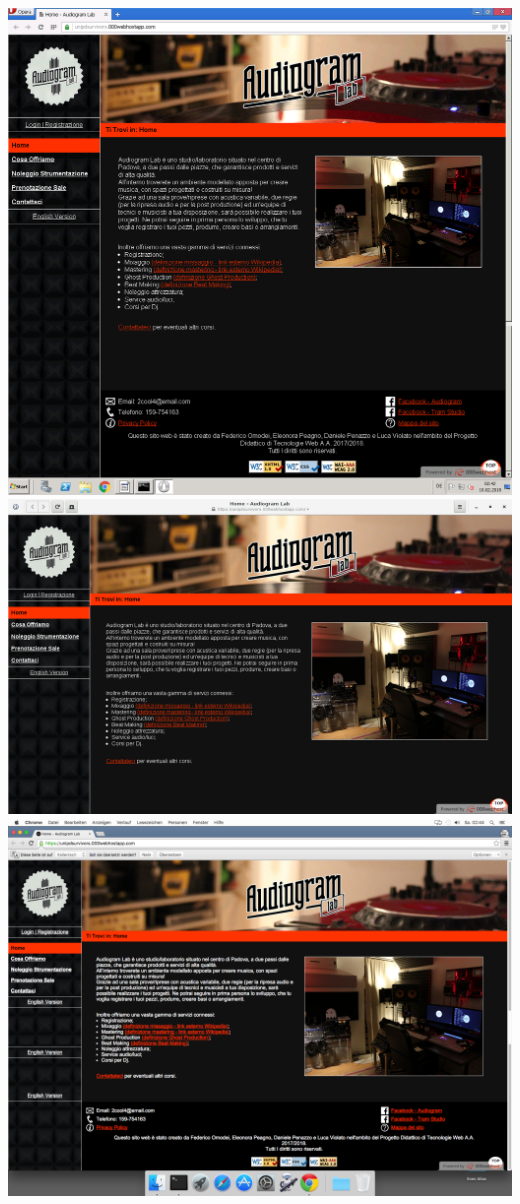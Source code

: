 \begin{center}
\vfill
\includegraphics[scale=0.25]{Images/Opera15Windows.png}
\vfill
\includegraphics[scale=0.25]{Images/Epiphany3Debian.png}
\vfill
\includegraphics[scale=0.7]{Images/Chrome48MacOSX.png}

\end{center}
